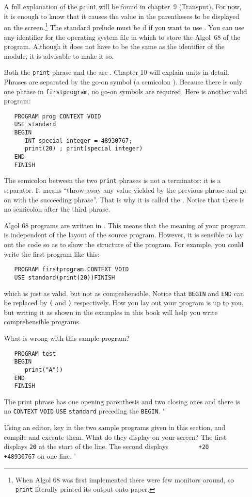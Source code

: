 A full explanation of the \verb|print|  will be found in
chapter~9 (Transput).  For now, it is enough to know that it causes
the value in the parentheses to be displayed on the
screen.\footnote{When Algol 68 was first implemented there were few
monitors around, so \texttt{print} literally printed its output onto
paper.} The standard prelude must be d if you want to use
. You can use any identifier for the operating system
file in which to store the Algol~68  of the
program. Although it does not have to be the same as the identifier
of the module, it is advisable to make it so.

Both the \verb|print| phrase and the  are
.  Chapter 10 will explain units in detail.  Phrases
are separated by the go-on symbol (a semicolon \ixtt{;}).  Because
there is only one phrase in \verb|firstprogram|, no go-on symbols are
required.  Here is another valid program:
\begin{verbatim}
   PROGRAM prog CONTEXT VOID
   USE standard
   BEGIN
      INT special integer = 48930767;
      print(20) ; print(special integer)
   END
   FINISH
\end{verbatim}
\noindent
The semicolon between the two \verb|print| phrases is not a
terminator: it is a separator.  It means ``throw away any value
yielded by the previous phrase and go on with the succeeding
phrase''.  That is why it is called the
.  Notice that there is no semicolon
after the third phrase.

Algol 68 programs are written in . This means that
the meaning of your program is independent of the layout of the
source program. However, it is sensible to lay out the code so as to
show the structure of the program. For example, you could write the
first program like this:
\begin{verbatim}
   PROGRAM firstprogram CONTEXT VOID
   USE standard(print(20))FINISH
\end{verbatim}
\noindent
which is just as valid, but not as comprehensible. Notice that
\verb|BEGIN| and \verb|END| can be replaced by \verb|(| and \verb|)|
respectively.  How you lay out your program is up to you, but writing
it as shown in the examples in this book will help you write
comprehensible programs.

\begin{exercise}
\item What is wrong with this sample program?
\begin{verbatim}
   PROGRAM test
   BEGIN
      print("A"))
   END
   FINISH
\end{verbatim}
\indent\ans The print phrase has one opening parenthesis and two
closing ones and there is no \verb|CONTEXT| \verb|VOID| \verb|USE|
\verb|standard| preceding the \verb|BEGIN|.
'
\item Using an editor, key in the two sample programs given in this
section, and compile and execute them. What do they display on your
screen?  \ans The first displays \verb|20| at the start of the line.
The second displays \verb*|        +20   +48930767| on one line.
'
\end{exercise}

